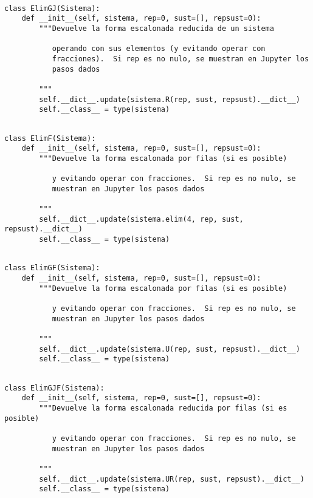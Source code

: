 \documentclass[11pt]{report}
\begin{document}
\begin{verbatim}

class ElimGJ(Sistema):
    def __init__(self, sistema, rep=0, sust=[], repsust=0):
        """Devuelve la forma escalonada reducida de un sistema

           operando con sus elementos (y evitando operar con
           fracciones).  Si rep es no nulo, se muestran en Jupyter los
           pasos dados

        """
        self.__dict__.update(sistema.R(rep, sust, repsust).__dict__)
        self.__class__ = type(sistema)

\end{verbatim}

\begin{verbatim}

class ElimF(Sistema):
    def __init__(self, sistema, rep=0, sust=[], repsust=0):
        """Devuelve la forma escalonada por filas (si es posible)

           y evitando operar con fracciones.  Si rep es no nulo, se
           muestran en Jupyter los pasos dados

        """        
        self.__dict__.update(sistema.elim(4, rep, sust, repsust).__dict__)
        self.__class__ = type(sistema)

\end{verbatim}

\begin{verbatim}

class ElimGF(Sistema):
    def __init__(self, sistema, rep=0, sust=[], repsust=0):
        """Devuelve la forma escalonada por filas (si es posible)

           y evitando operar con fracciones.  Si rep es no nulo, se
           muestran en Jupyter los pasos dados

        """        
        self.__dict__.update(sistema.U(rep, sust, repsust).__dict__)
        self.__class__ = type(sistema)

\end{verbatim}

\begin{verbatim}

class ElimGJF(Sistema):
    def __init__(self, sistema, rep=0, sust=[], repsust=0):
        """Devuelve la forma escalonada reducida por filas (si es posible)

           y evitando operar con fracciones.  Si rep es no nulo, se
           muestran en Jupyter los pasos dados

        """        
        self.__dict__.update(sistema.UR(rep, sust, repsust).__dict__)
        self.__class__ = type(sistema)

\end{verbatim}
\end{document}
